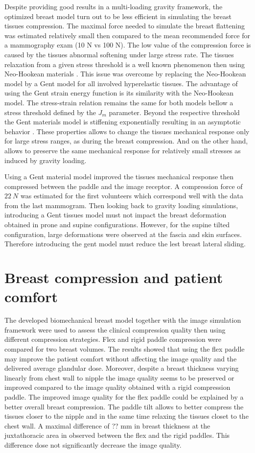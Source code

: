 Despite providing good results in a multi-loading gravity framework, the optimized breast model turn out to be less efficient in simulating the breast tissues compression. The maximal force needed to simulate the breast flattening was estimated relatively small then compared to the mean recommended force for a mammography exam (10 N vs 100 N). The low value of the compression force is caused by the tissues abnormal softening under large stress rate.  The tissues relaxation from a given stress threshold is a well known phenomenon then using Neo-Hookean materials . This issue was overcome by replacing the Neo-Hookean model by a Gent model for all involved hyperelastic tissues. The advantage of using the Gent strain energy function is its similarity with the Neo-Hookean model. The stress-strain relation remains the same for both models bellow a stress threshold defined by the $J_m$ parameter. Beyond the respective threshold the Gent materials model is stiffening exponentially resulting in an asymptotic behavior . These properties allows to change the tissues mechanical response only for large stress ranges, as during the breast compression. And on the other hand, allows to preserve the same mechanical response for relatively small stresses as induced by gravity loading.

Using a Gent material model improved the tissues mechanical response then compressed between the paddle and the image receptor. A compression force of $22 \ N$ was estimated for the first volunteers which correspond well with the data from the last mammogram. Then looking back to gravity loading simulations, introducing a Gent tissues model must not impact the breast deformation obtained in prone and supine configurations. However, for the supine tilted configuration, large deformations were observed at the fascia and skin surfaces. Therefore introducing the gent model must reduce the lest breast lateral sliding. 

\section{Breast compression and patient comfort}
The developed biomechanical breast model together with the image simulation framework were used to assess the clinical compression quality then using different compression strategies. Flex and rigid paddle compression were compared for two breast volumes. The results showed that using the flex paddle may improve the patient comfort without affecting the image quality and the delivered average glandular dose. Moreover, despite a breast thickness varying linearly from chest wall to nipple the image quality seems to be preserved or improved compared to the image quality obtained with a rigid compression paddle. The improved image quality for the flex paddle could be explained by a better overall breast compression. The paddle tilt allows to better compress the tissues closer to the nipple and in the same time relaxing the tissues closet to the chest wall. A maximal difference of ?? mm in breast thickness at the juxtathoracic area in observed between the flex and the rigid paddles. This difference dose not significantly decrease the image quality. 
\cleardoublepage
